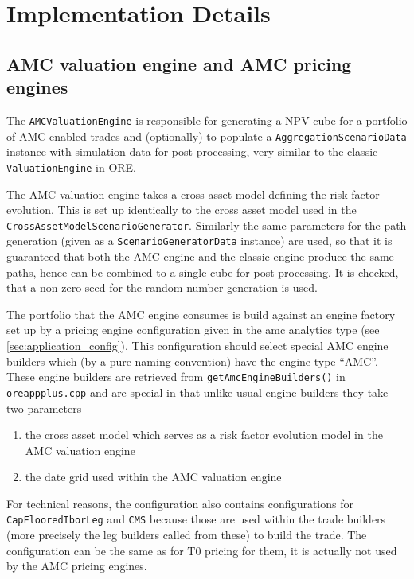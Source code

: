 \documentclass[12pt, a4paper]{article}
\begin{document}
\section{Implementation Details}\label{sec:implementation_details}

\subsection{AMC valuation engine and AMC pricing engines}

The \verb+AMCValuationEngine+ is responsible for generating a NPV cube for a portfolio of AMC enabled trades and
(optionally) to populate a \verb+AggregationScenarioData+ instance with simulation data for post processing, very
similar to the classic \verb+ValuationEngine+ in ORE.

The AMC valuation engine takes a cross asset model defining the risk factor evolution. This is set up identically to the
cross asset model used in the \\ \verb+CrossAssetModelScenarioGenerator+. Similarly the same parameters for the path
generation (given as a \verb+ScenarioGeneratorData+ instance) are used, so that it is guaranteed that both the AMC
engine and the classic engine produce the same paths, hence can be combined to a single cube for post processing. It is
checked, that a non-zero seed for the random number generation is used.

The portfolio that the AMC engine consumes is build against an engine factory set up by a pricing engine configuration
given in the amc analytics type (see \ref{sec:application_config}). This configuration should select special AMC engine
builders which (by a pure naming convention) have the engine type ``AMC''. These engine builders are retrieved from
\verb+getAmcEngineBuilders()+ in \verb+oreappplus.cpp+ and are special in that unlike usual engine builders they take
two parameters

\begin{enumerate}
\item the cross asset model which serves as a risk factor evolution model in the AMC valuation engine
\item the date grid used within the AMC valuation engine
\end{enumerate}

For technical reasons, the configuration also contains configurations for \\ \verb+CapFlooredIborLeg+ and \verb+CMS+
because those are used within the trade builders (more precisely the leg builders called from these) to build the
trade. The configuration can be the same as for T0 pricing for them, it is actually not used by the AMC pricing engines.
\end{document}
